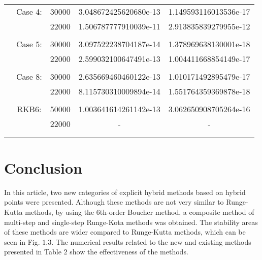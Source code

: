 ‎\documentclass[a4paper,10pt]{article}‎
\begin{document}
\begin{small}
\begin{table}
\begin{center}
\begin{tabular}{ccccc}
 &Case 4:&                                               30000 &3.048672425620680e-13     &1.149593116013536e-17\\
 &           &                                               22000 &1.506787777910039e-11    & 2.913835839279955e-12\\\\
 
 
     &Case 5:&                                30000 & 3.097522238704187e-14   &  1.378969638130001e-18\\
 &&                                              22000 &2.599032100647491e-13    & 1.004411668854149e-17\\\\

 
     &Case 8:&                                30000 &2.635669460460122e-13   &  1.010171492895479e-17\\
 &&                                              22000 &8.115730310009894e-14   &  1.551764359369878e-18\\\\

    &RKB6:&                                50000 &1.003641614261142e-13   &  3.062650908705264e-16\\
 &&                                              22000 &-   &  -\\\\

\hline\\
\end{tabular}
\end{center}
\end{table}
\end{small}
\newpage
\section{\textbf{Conclusion}}
In this article, two new categories of explicit hybrid methods based on hybrid points were presented. Although these methods are not very similar to Runge-Kutta methods, by using the 6th-order Boucher method, a composite method of multi-step and single-step Runge-Kota methods was obtained. The stability areas of these methods are wider compared to Runge-Kutta methods, which can be seen in Fig. $1.3$. The numerical results related to the new and existing methods presented in Table $2$ show the effectiveness of the methods.
\end{document}
